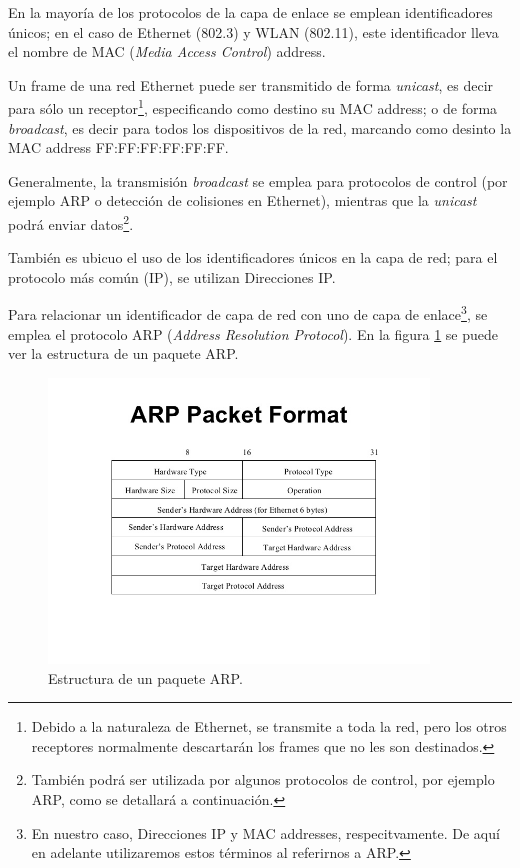 \par En la mayoría de los protocolos de la capa de enlace se emplean identificadores únicos; en el caso de Ethernet (802.3) y WLAN (802.11), este identificador lleva el nombre de MAC (\textit{Media Access Control}) address.

\par Un frame de una red Ethernet puede ser transmitido de forma \textit{unicast}, es decir para sólo un receptor\footnote{Debido a la naturaleza de Ethernet, se transmite a toda la red, pero los otros receptores normalmente descartarán los frames que no les son destinados.}, especificando como destino su MAC address; o de forma \textit{broadcast}, es decir para todos los dispositivos de la red, marcando como desinto la MAC address FF:FF:FF:FF:FF:FF.

\par Generalmente, la transmisión \textit{broadcast} se emplea para protocolos de control (por ejemplo ARP o detección de colisiones en Ethernet), mientras que la \textit{unicast} podrá enviar datos\footnote{También podrá ser utilizada por algunos protocolos de control, por ejemplo ARP, como se detallará a continuación.}.

\par También es ubicuo el uso de los identificadores únicos en la capa de red; para el protocolo más común (IP), se utilizan Direcciones IP.

\par Para relacionar un identificador de capa de red con uno de capa de enlace\footnote{En nuestro caso, Direcciones IP y MAC addresses, respecitvamente. De aquí en adelante utilizaremos estos términos al referirnos a ARP.}, se emplea el protocolo ARP (\textit{Address Resolution Protocol}).
En la figura \ref{ARPpacket} se puede ver la estructura de un paquete ARP.

\begin{figure}[ht]
    \centering
    \includegraphics[width=0.9\textwidth]{figuras/ARPpacket}
    \caption{Estructura de un paquete ARP.}\label{ARPpacket}
\end{figure}


